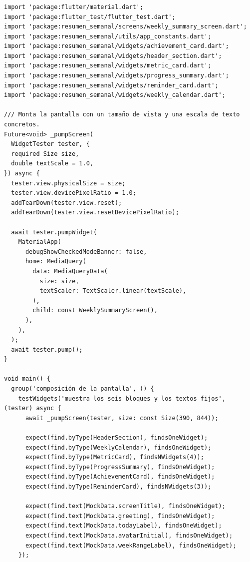 \documentclass[12pt,a4paper]{article}
\newcommand{\codigo}[1]{\texttt{\detokenize{#1}}}
\begin{document}
\subsubsection*{\codigo{test/weekly_summary_screen_test.dart}}
\begin{lstlisting}
import 'package:flutter/material.dart';
import 'package:flutter_test/flutter_test.dart';
import 'package:resumen_semanal/screens/weekly_summary_screen.dart';
import 'package:resumen_semanal/utils/app_constants.dart';
import 'package:resumen_semanal/widgets/achievement_card.dart';
import 'package:resumen_semanal/widgets/header_section.dart';
import 'package:resumen_semanal/widgets/metric_card.dart';
import 'package:resumen_semanal/widgets/progress_summary.dart';
import 'package:resumen_semanal/widgets/reminder_card.dart';
import 'package:resumen_semanal/widgets/weekly_calendar.dart';

/// Monta la pantalla con un tamaño de vista y una escala de texto concretos.
Future<void> _pumpScreen(
  WidgetTester tester, {
  required Size size,
  double textScale = 1.0,
}) async {
  tester.view.physicalSize = size;
  tester.view.devicePixelRatio = 1.0;
  addTearDown(tester.view.reset);
  addTearDown(tester.view.resetDevicePixelRatio);

  await tester.pumpWidget(
    MaterialApp(
      debugShowCheckedModeBanner: false,
      home: MediaQuery(
        data: MediaQueryData(
          size: size,
          textScaler: TextScaler.linear(textScale),
        ),
        child: const WeeklySummaryScreen(),
      ),
    ),
  );
  await tester.pump();
}

void main() {
  group('composición de la pantalla', () {
    testWidgets('muestra los seis bloques y los textos fijos', (tester) async {
      await _pumpScreen(tester, size: const Size(390, 844));

      expect(find.byType(HeaderSection), findsOneWidget);
      expect(find.byType(WeeklyCalendar), findsOneWidget);
      expect(find.byType(MetricCard), findsNWidgets(4));
      expect(find.byType(ProgressSummary), findsOneWidget);
      expect(find.byType(AchievementCard), findsOneWidget);
      expect(find.byType(ReminderCard), findsNWidgets(3));

      expect(find.text(MockData.screenTitle), findsOneWidget);
      expect(find.text(MockData.greeting), findsOneWidget);
      expect(find.text(MockData.todayLabel), findsOneWidget);
      expect(find.text(MockData.avatarInitial), findsOneWidget);
      expect(find.text(MockData.weekRangeLabel), findsOneWidget);
    });


\end{lstlisting}
\end{document}
